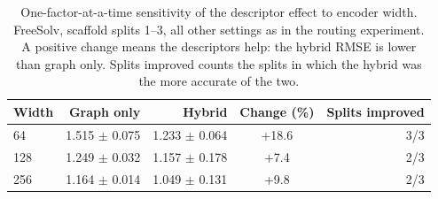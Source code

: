 \begin{table}[H]
\renewcommand{\thetable}{S21}
\centering
\small
\caption{One-factor-at-a-time sensitivity of the descriptor effect to encoder width. FreeSolv, scaffold splits 1--3, all other settings as in the routing experiment. A positive change means the descriptors help: the hybrid RMSE is lower than graph only. Splits improved counts the splits in which the hybrid was the more accurate of the two.}
\label{tab:hp-sensitivity}
\begin{tabular}{lrrcr}
\toprule
Width & Graph only & Hybrid & Change (\%) & Splits improved \\
\midrule
64 & 1.515 $\pm$ 0.075 & 1.233 $\pm$ 0.064 & +18.6 & 3/3 \\
128 & 1.249 $\pm$ 0.032 & 1.157 $\pm$ 0.178 & +7.4 & 2/3 \\
256 & 1.164 $\pm$ 0.014 & 1.049 $\pm$ 0.131 & +9.8 & 2/3 \\
\bottomrule
\end{tabular}
\end{table}
